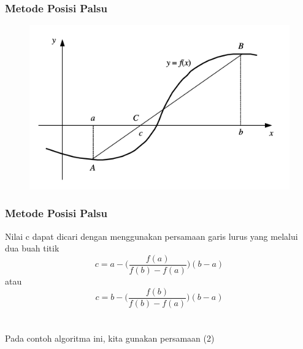 \documentclass{beamer}
\begin{document}
\begin{frame}
\frametitle{Metode Posisi Palsu}
\begin{figure}[htp]
\centering
\includegraphics[scale=0.50]{AlurPosisiPalsu.png}
\end{figure}
\end{frame}


\begin{frame}
\frametitle{Metode Posisi Palsu}
Nilai c dapat dicari dengan menggunakan persamaan garis lurus yang melalui dua buah titik
\begin{equation}
c = a - \biggl(\dfrac{f(a)}{f(b)-f(a)}\biggr)(b-a)
\end{equation}
atau
\begin{equation}
c = b - \biggl(\dfrac{f(b)}{f(b)-f(a)}\biggr)(b-a)
\end{equation}
\ \\\ \\Pada contoh algoritma ini, kita gunakan persamaan (2)
\end{frame}

\end{document}
